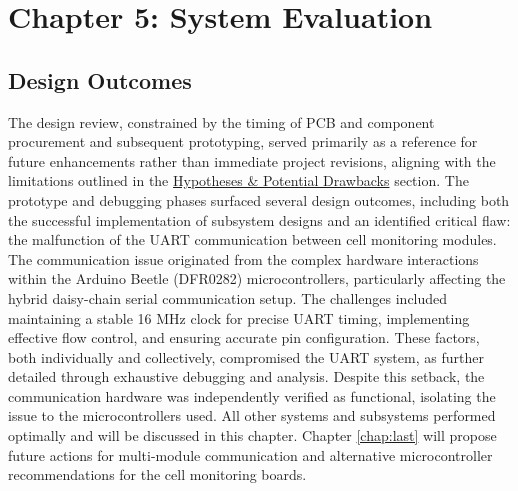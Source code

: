 \chapter[System Evaluation]{Chapter 5: System Evaluation}\label{chap:before_last}
\section{Design Outcomes}\label{sec:DO_}
The design review, constrained by the timing of PCB and component procurement and subsequent prototyping, served primarily as a reference for future enhancements rather than immediate project revisions, aligning with the limitations outlined in the \hyperref[sec:drawbacks]{Hypotheses \& Potential Drawbacks} section. The prototype and debugging phases surfaced several design outcomes, including both the successful implementation of subsystem designs and an identified critical flaw: the malfunction of the UART communication between cell monitoring modules.\newline\newline
\noindent
The communication issue originated from the complex hardware interactions within the Arduino Beetle (DFR0282) microcontrollers, particularly affecting the hybrid daisy-chain serial communication setup. The challenges included maintaining a stable 16 MHz clock for precise UART timing, implementing effective flow control, and ensuring accurate pin configuration. These factors, both individually and collectively, compromised the UART system, as further detailed through exhaustive debugging and analysis.\newline\newline
\noindent
Despite this setback, the communication hardware was independently verified as functional, isolating the issue to the microcontrollers used. All other systems and subsystems performed optimally and will be discussed in this chapter. Chapter \ref{chap:last} will propose future actions for multi-module communication and alternative microcontroller recommendations for the cell monitoring boards.
